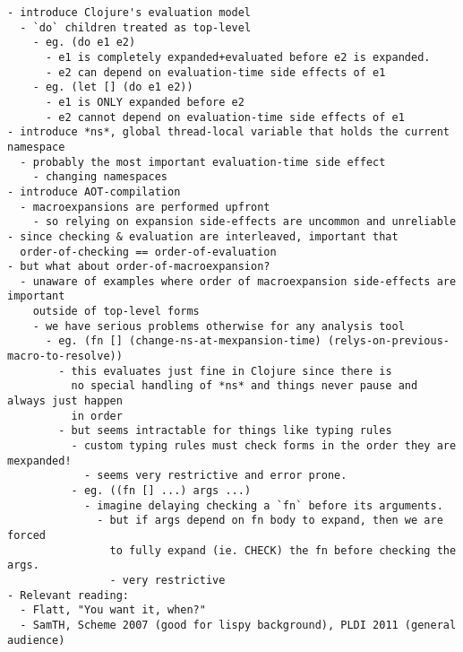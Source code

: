 {
\singlespacing
\begin{verbatim}
- introduce Clojure's evaluation model
  - `do` children treated as top-level
    - eg. (do e1 e2)
      - e1 is completely expanded+evaluated before e2 is expanded.
      - e2 can depend on evaluation-time side effects of e1
    - eg. (let [] (do e1 e2))
      - e1 is ONLY expanded before e2
      - e2 cannot depend on evaluation-time side effects of e1
- introduce *ns*, global thread-local variable that holds the current namespace
  - probably the most important evaluation-time side effect
    - changing namespaces
- introduce AOT-compilation
  - macroexpansions are performed upfront
    - so relying on expansion side-effects are uncommon and unreliable
- since checking & evaluation are interleaved, important that
  order-of-checking == order-of-evaluation
- but what about order-of-macroexpansion?
  - unaware of examples where order of macroexpansion side-effects are important
    outside of top-level forms
    - we have serious problems otherwise for any analysis tool
      - eg. (fn [] (change-ns-at-mexpansion-time) (relys-on-previous-macro-to-resolve))
        - this evaluates just fine in Clojure since there is
          no special handling of *ns* and things never pause and always just happen
          in order
        - but seems intractable for things like typing rules
          - custom typing rules must check forms in the order they are mexpanded!
            - seems very restrictive and error prone.
          - eg. ((fn [] ...) args ...)
            - imagine delaying checking a `fn` before its arguments.
              - but if args depend on fn body to expand, then we are forced
                to fully expand (ie. CHECK) the fn before checking the args.
                - very restrictive
- Relevant reading:
  - Flatt, "You want it, when?"
  - SamTH, Scheme 2007 (good for lispy background), PLDI 2011 (general audience)
\end{verbatim}
}


